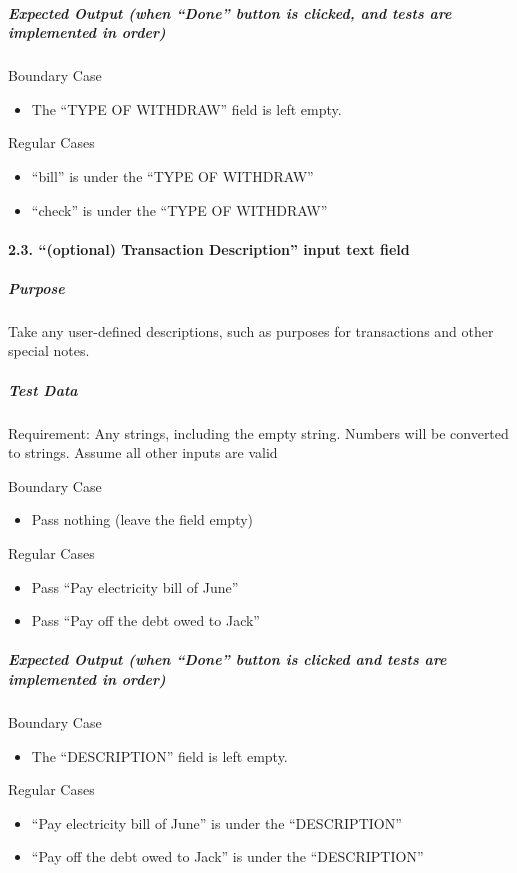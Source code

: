 \documentclass[12pt]{article}
\begin{document}
\subparagraph{Expected Output (when ``Done'' button is clicked, and tests are implemented in order)}

Boundary Case
\begin{itemize}
  \item The ``TYPE OF WITHDRAW'' field is left empty.
\end{itemize}

Regular Cases
\begin{itemize}
  \item ``bill'' is under the ``TYPE OF WITHDRAW''
  \item ``check'' is under the ``TYPE OF WITHDRAW'' 
\end{itemize}

\paragraph{2.3. ``(optional) Transaction Description'' input text field}
 
\subparagraph{Purpose} Take any user-defined descriptions, such as purposes for transactions and other special notes.
 
\subparagraph{Test Data} Requirement: Any strings, including the empty string. Numbers will be converted to strings. Assume all other inputs are valid
 
Boundary Case
\begin{itemize}
  \item Pass nothing (leave the field empty)
  \end{itemize}

Regular Cases
\begin{itemize}
  \item Pass ``Pay electricity bill of June''
  \item Pass ``Pay off the debt owed to Jack''
 \end{itemize}
 
\subparagraph{Expected Output (when ``Done'' button is clicked and tests are implemented in order)}
 
Boundary Case
\begin{itemize}
  \item The ``DESCRIPTION'' field is left empty. 
\end{itemize}

Regular Cases
\begin{itemize}
  \item ``Pay electricity bill of June'' is under the ``DESCRIPTION'' 
  \item ``Pay off the debt owed to Jack'' is under the ``DESCRIPTION''
 \end{itemize}
\end{document}
